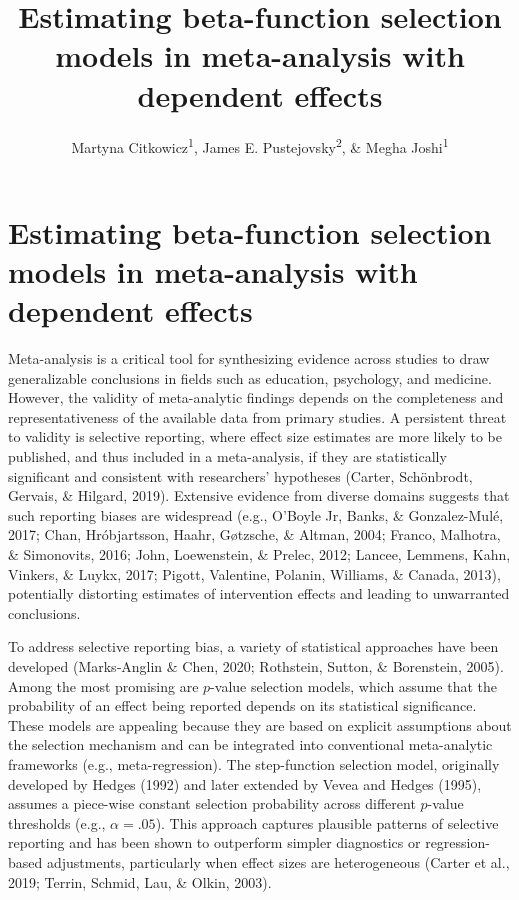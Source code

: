 \documentclass[
  american,
  man, donotrepeattitle,floatsintext]{apa7}
\title{Estimating beta-function selection models in meta-analysis with dependent effects}
\author{Martyna Citkowicz\textsuperscript{1}, James E. Pustejovsky\textsuperscript{2}, \& Megha Joshi\textsuperscript{1}}
\date{}
\affiliation{\vspace{0.5cm}\textsuperscript{1} American Institutes for Research\\\textsuperscript{2} University of Wisconsin-Madison}
\begin{document}
\maketitle

\section{Estimating beta-function selection models in meta-analysis with dependent effects}\label{introduction}

Meta-analysis is a critical tool for synthesizing evidence across studies to draw generalizable conclusions in fields such as education, psychology, and medicine. However, the validity of meta-analytic findings depends on the completeness and representativeness of the available data from primary studies. A persistent threat to validity is selective reporting, where effect size estimates are more likely to be published, and thus included in a meta-analysis, if they are statistically significant and consistent with researchers' hypotheses (Carter, Schönbrodt, Gervais, \& Hilgard, 2019). Extensive evidence from diverse domains suggests that such reporting biases are widespread (e.g., O'Boyle Jr, Banks, \& Gonzalez-Mulé, 2017; Chan, Hróbjartsson, Haahr, Gøtzsche, \& Altman, 2004; Franco, Malhotra, \& Simonovits, 2016; John, Loewenstein, \& Prelec, 2012; Lancee, Lemmens, Kahn, Vinkers, \& Luykx, 2017; Pigott, Valentine, Polanin, Williams, \& Canada, 2013), potentially distorting estimates of intervention effects and leading to unwarranted conclusions.

To address selective reporting bias, a variety of statistical approaches have been developed (Marks‐Anglin \& Chen, 2020; Rothstein, Sutton, \& Borenstein, 2005). Among the most promising are \(p\)-value selection models, which assume that the probability of an effect being reported depends on its statistical significance. These models are appealing because they are based on explicit assumptions about the selection mechanism and can be integrated into conventional meta-analytic frameworks (e.g., meta-regression). The step-function selection model, originally developed by Hedges (1992) and later extended by Vevea and Hedges (1995), assumes a piece-wise constant selection probability across different \(p\)-value thresholds (e.g., \(\alpha = .05\)). This approach captures plausible patterns of selective reporting and has been shown to outperform simpler diagnostics or regression-based adjustments, particularly when effect sizes are heterogeneous (Carter et al., 2019; Terrin, Schmid, Lau, \& Olkin, 2003).
\end{document}
